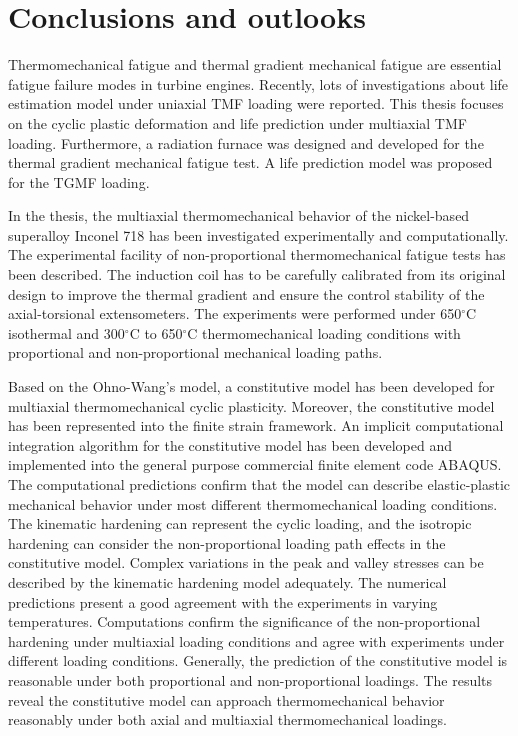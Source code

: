 \chapter{Conclusions and outlooks}
\noindent
Thermomechanical fatigue and thermal gradient mechanical fatigue are essential fatigue failure modes in turbine engines.
Recently, lots of investigations about life estimation model under uniaxial TMF loading were reported. This thesis focuses on the cyclic plastic deformation and life prediction under multiaxial TMF loading. Furthermore, a radiation furnace was designed and developed for the thermal gradient mechanical fatigue test. A life prediction model was proposed for the TGMF loading.

In the thesis, the multiaxial thermomechanical behavior of the nickel-based superalloy Inconel 718 has been investigated experimentally and computationally.
The experimental facility of non-proportional thermomechanical fatigue tests has been described. The induction coil has to be carefully calibrated from its original design to improve the thermal gradient and ensure the control stability of the axial-torsional extensometers. The experiments were performed under 650$^\circ$C isothermal and 300$^\circ$C to 650$^\circ$C thermomechanical loading conditions with proportional and non-proportional mechanical loading paths. 

Based on the Ohno-Wang's model, a constitutive model has been developed for multiaxial thermomechanical cyclic plasticity.
Moreover, the constitutive model has been represented into the finite strain framework.
An implicit computational integration algorithm for the constitutive model has been developed and implemented into the general purpose commercial finite element code ABAQUS. The computational predictions confirm that the model can describe elastic-plastic mechanical behavior under most different thermomechanical loading conditions.
The kinematic hardening can represent the cyclic loading, and the isotropic hardening can consider the non-proportional loading path effects in the constitutive model.
Complex variations in the peak and valley stresses can be described by the kinematic hardening model adequately. The numerical predictions present a good agreement with the experiments in varying temperatures.
Computations confirm the significance of the non-proportional hardening under multiaxial loading conditions and agree with experiments under different loading conditions. Generally, the prediction of the constitutive model is reasonable under both proportional and non-proportional loadings.
The results reveal the constitutive model can approach thermomechanical behavior reasonably under both axial and multiaxial thermomechanical loadings.

